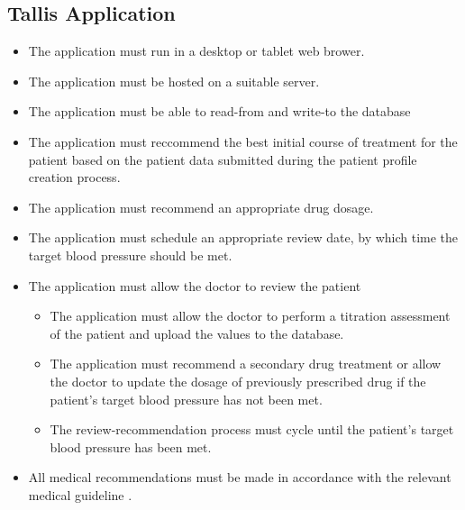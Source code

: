 \documentclass[11pt]{article}
\begin{document}
\subsection{Tallis Application}
\begin{itemize}
\item The application must run in a desktop or tablet web brower.
\item The application must be hosted on a suitable server.
\item The application must be able to read-from and write-to the database
\item The application must reccommend the best initial course of treatment for the patient based on the patient data submitted during the patient profile creation process.
\item The application must recommend an appropriate drug dosage.
\item The application must schedule an appropriate review date, by which time the target blood pressure should be met.
\item The application must allow the doctor to review the patient
	\begin{itemize}
    \item The application must allow the doctor to perform a titration assessment of the patient and upload the values to the database.
    \item The application must recommend a secondary drug treatment or allow the doctor to update the dosage of previously prescribed drug if the patient's target blood pressure has not been met.
    \item The review-recommendation process must cycle until the patient's target blood pressure has been met.
    \end{itemize}
\item All medical recommendations must be made in accordance with the relevant medical guideline \cite{CG127}.
\end{itemize}
\end{document}
